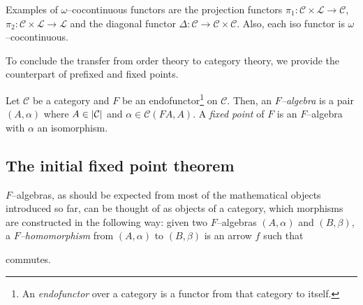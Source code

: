 Examples of \(\omega\)--cocontinuous functors are the projection functors \(\pi_1 \colon \mathcal{C} \times \mathcal{L} \to \mathcal{C}\), \(\pi_2 \colon \mathcal{C} \times \mathcal{L} \to \mathcal{L}\) and the diagonal functor \(\Delta \colon \mathcal{C} \to \mathcal{C} \times \mathcal{C}\). %
Also, each iso functor is \(\omega\)--cocontinuous. %

To conclude the transfer from order theory to category theory, we provide the counterpart of prefixed and fixed points.

\begin{dfn}
  Let \(\mathcal{C}\) be a category and \(F\) be an endofunctor\footnote{An \emph{endofunctor} over a category is a functor from that category to itself.} on \(\mathcal{C}\).
  Then, an \emph{\(F\)--algebra} is a pair \((A,\alpha)\) where \(A \in \lvert \mathcal{C} \rvert\) and \(\alpha \in \mathcal{C}(FA,A)\).
  A \emph{fixed point} of \(F\) is an \(F\)--algebra with \(\alpha\) an isomorphism.%
\end{dfn}

\subsection{The initial fixed point theorem}

\(F\)--algebras, as should be expected from most of the mathematical objects introduced so far, can be thought of as objects of a category, which morphisms are constructed in the following way: given two \(F\)--algebras \((A,\alpha)\) and \((B,\beta)\), a \emph{\(F\)--homomorphism} from \((A,\alpha)\) to \((B,\beta)\) is an arrow \(f\) such that
\begin{center}
\end{center}
commutes.


